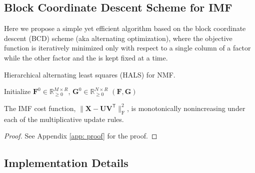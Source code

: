 \subsection{Block Coordinate Descent Scheme for IMF} \label{sec: bcd}

Here we propose a simple yet efficient algorithm based on the block coordinate descent (BCD) scheme (aka alternating optimization), where the objective function is iteratively minimized only with respect to a single column of a factor while the other factor and the  is kept fixed at a time.



\begin{algorithm}[!t]
	\caption{Hierarchical alternating least squares (HALS) for NMF. \label{alg:lrf:hals for nmf}}
	\DontPrintSemicolon
	\SetAlgoLined
	Initialize $\bm{F}^{0} \in \mathbb{R}_{\ge 0}^{M \times R}$, $\bm{G}^{0} \in \mathbb{R}_{\ge 0}^{N \times R}$\;
	\Return $(\bm{F}, \bm{G})$
\end{algorithm}




\begin{theorem}  \label{the: bcd monotonicity}
The IMF cost function, $\| \bm{X} - \bm{U} \bm{V}^\mathsf{T} \|_\text{F}^2$, is monotonically nonincreasing under each of the multiplicative update rules.
\end{theorem}

\begin{proof}
See Appendix \ref{app: proof} for the proof.
\end{proof}


\subsection{Implementation Details} \label{sec: implementation details}